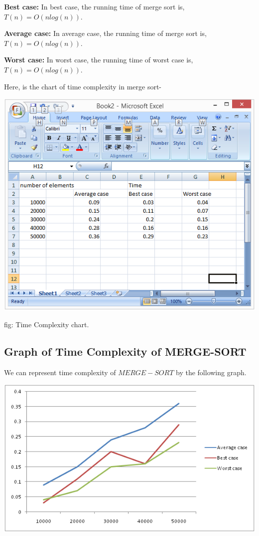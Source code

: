 \documentclass[9 pt]{report}
\begin{document}
\textbf{Best case:} In best case, the running time of merge sort is,$T(n)=O(nlog(n))$.
\vspace{0.5cm}

\textbf{Average case:} In average case, the running time of merge sort is, $T(n)=O(nlog(n))$.
\vspace{0.3cm}

\textbf{Worst case:} In worst case, the running time of worst case is, $T(n)=O(nlog(n))$.

Here, is the chart of time complexity in merge sort-

\vspace{1cm}

\includegraphics{mergedata.png}

\hspace{5cm}fig: Time Complexity chart.

\subsection{\huge Graph of Time Complexity of MERGE-SORT}

We can represent time complexity of $MERGE-SORT$ by the following graph.


\includegraphics{mergesort.png}
\end{document}
